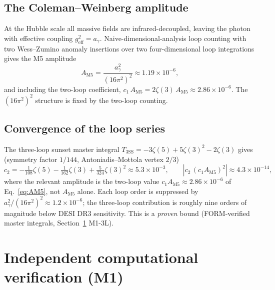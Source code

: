 \documentclass[11pt,a4paper]{article}
\theoremstyle{plain}
\theoremstyle{definition}
\theoremstyle{remark}
\newcommand{\ag}{a_\gamma}
\begin{document}
\subsection{The Coleman--Weinberg amplitude}
At the Hubble scale all massive fields are infrared-decoupled, leaving the photon with effective
coupling $g_{\mathrm{eff}}^2 = \ag$. Naive-dimensional-analysis loop counting with two
Wess--Zumino anomaly insertions over two four-dimensional loop integrations gives the M5
amplitude
\begin{equation}
\label{eq:AM5}
A_{\mathrm{M5}} = \frac{\ag^2}{(16\pi^2)^2} \approx 1.19\times 10^{-6},
\end{equation}
and including the two-loop coefficient, $c_1\,A_{\mathrm{M5}} = 2\zeta(3)\,A_{\mathrm{M5}}
\approx 2.86\times 10^{-6}$. The $(16\pi^2)^2$ structure is fixed by the two-loop counting.

\subsection{Convergence of the loop series}
The three-loop sunset master integral
$T_{3\mathrm{SS}} = -3\zeta(5) + 5\zeta(3)^2 - 2\zeta(3)$ gives (symmetry factor $1/144$,
Antoniadis--Mottola vertex $2/3$)
\begin{equation}
c_2 = -\tfrac{1}{108}\zeta(5) - \tfrac{1}{162}\zeta(3) + \tfrac{5}{324}\zeta(3)^2
  \approx 5.3\times 10^{-3} ,
\qquad
|c_2\,(c_1 A_{\mathrm{M5}})^2| \approx 4.3\times 10^{-14} ,
\end{equation}
where the relevant amplitude is the two-loop value $c_1 A_{\mathrm{M5}} \approx 2.86\times 10^{-6}$
of Eq.~\eqref{eq:AM5}, not $A_{\mathrm{M5}}$ alone.
Each loop order is suppressed by $\ag^2/(16\pi^2)^2 \approx 1.2\times 10^{-6}$; the three-loop
contribution is roughly nine orders of magnitude below DESI DR3 sensitivity. This is a
\emph{proven} bound (FORM-verified master integrals, Section~\ref{sec:m1} M1-3L).

\section{Independent computational verification (M1)}
\label{sec:m1}
\end{document}
